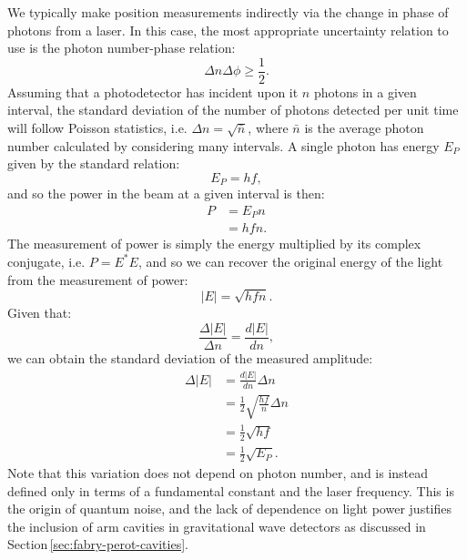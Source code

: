 We typically make position measurements indirectly via the change in phase of photons from a laser. In this case, the most appropriate uncertainty relation to use is the photon number-phase relation:
\begin{equation}
  \label{eq:photon-phase-hup}
  \Delta n \Delta \phi \geq \frac{1}{2}.
\end{equation}
Assuming that a photodetector has incident upon it $n$ photons in a given interval, the standard deviation of the number of photons detected per unit time will follow Poisson statistics, i.e. $\Delta n = \sqrt{\bar{n}}$, where $\bar{n}$ is the average photon number calculated by considering many intervals. A single photon has energy $E_P$ given by the standard relation:
\begin{equation}
  E_P = hf,
\end{equation}
and so the power in the beam at a given interval is then:
\begin{equation}
  \begin{split}
    P &= E_P n \\
      &= hfn.
  \end{split}
\end{equation}
The measurement of power is simply the energy multiplied by its complex conjugate, i.e. $P = E^{\ast}E$, and so we can recover the original energy of the light from the measurement of power:
\begin{equation}
  \left| E \right| = \sqrt{hfn}.
\end{equation}
Given that:
\begin{equation}
  \frac{\Delta \left| E \right|}{\Delta n} = \frac{d \left| E \right|}{dn},
\end{equation}
we can obtain the standard deviation of the measured amplitude:
\begin{equation}
  \label{eq:std-dev-amp}
  \begin{split}
    \Delta \left| E \right| &= \frac{d \left| E \right|}{dn} \Delta n \\
                            &= \frac{1}{2} \sqrt{\frac{hf}{n}} \Delta n \\
                            &= \frac{1}{2} \sqrt{hf} \\
                            &= \frac{1}{2} \sqrt{E_P}.
  \end{split}
\end{equation}
Note that this variation does not depend on photon number, and is instead defined only in terms of a fundamental constant and the laser frequency. This is the origin of quantum noise, and the lack of dependence on light power justifies the inclusion of arm cavities in gravitational wave detectors as discussed in Section\,\ref{sec:fabry-perot-cavities}.

